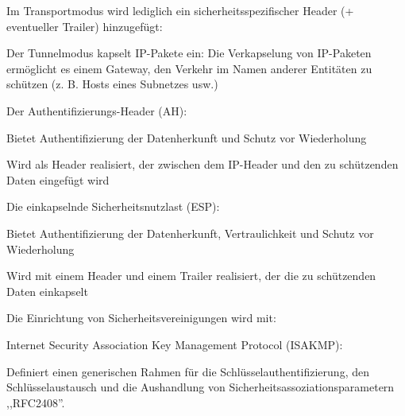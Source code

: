 \documentclass[a4paper]{article}
\begin{document}
\begin{multicols}{3}
      Im Transportmodus wird lediglich ein sicherheitsspezifischer Header (+ eventueller Trailer) hinzugefügt:
      \begin{itemize*} %
            \item Der Tunnelmodus kapselt IP-Pakete ein: Die Verkapselung von IP-Paketen ermöglicht es einem Gateway, den Verkehr im Namen anderer Entitäten zu schützen (z. B. Hosts eines Subnetzes usw.)
            \item Der Authentifizierungs-Header (AH):
            \begin{itemize*}
                  \item Bietet Authentifizierung der Datenherkunft und Schutz vor Wiederholung
                  \item Wird als Header realisiert, der zwischen dem IP-Header und den zu schützenden Daten eingefügt wird
            \end{itemize*}
            \item Die einkapselnde Sicherheitsnutzlast (ESP):
            \begin{itemize*}
                  \item Bietet Authentifizierung der Datenherkunft, Vertraulichkeit und Schutz vor Wiederholung
                  \item Wird mit einem Header und einem Trailer realisiert, der die zu schützenden Daten einkapselt
            \end{itemize*}
            \item Die Einrichtung von Sicherheitsvereinigungen wird mit:
            \begin{itemize*}
                  \item Internet Security Association Key Management Protocol (ISAKMP):
                  \begin{itemize*}
                        \item Definiert einen generischen Rahmen für die Schlüsselauthentifizierung, den Schlüsselaustausch und die Aushandlung von Sicherheitsassoziationsparametern ,,RFC2408''.

\end{itemize*}
\end{itemize*}
\end{itemize*}
\end{multicols}
\end{document}
